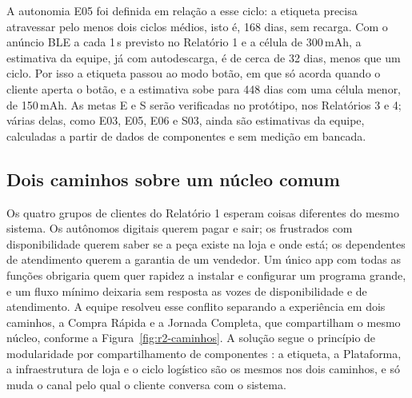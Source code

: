 A autonomia E05 foi definida em relação a esse ciclo: a etiqueta precisa atravessar pelo menos dois ciclos médios, isto é, 168 dias, sem recarga. Com o anúncio BLE a cada 1\,s previsto no Relatório 1 e a célula de 300\,mAh, a estimativa da equipe, já com autodescarga, é de cerca de 32 dias, menos que um ciclo. Por isso a etiqueta passou ao modo botão, em que só acorda quando o cliente aperta o botão, e a estimativa sobe para 448 dias com uma célula menor, de 150\,mAh. As metas E e S serão verificadas no protótipo, nos Relatórios 3 e 4; várias delas, como E03, E05, E06 e S03, ainda são estimativas da equipe, calculadas a partir de dados de componentes e sem medição em bancada.

\subsection{Dois caminhos sobre um núcleo comum}
\label{sub:r2-caminhos}

Os quatro grupos de clientes do Relatório 1 esperam coisas diferentes do mesmo sistema. Os autônomos digitais querem pagar e sair; os frustrados com disponibilidade querem saber se a peça existe na loja e onde está; os dependentes de atendimento querem a garantia de um vendedor. Um único app com todas as funções obrigaria quem quer rapidez a instalar e configurar um programa grande, e um fluxo mínimo deixaria sem resposta as vozes de disponibilidade e de atendimento. A equipe resolveu esse conflito separando a experiência em dois caminhos, a Compra Rápida e a Jornada Completa, que compartilham o mesmo núcleo, conforme a Figura~\ref{fig:r2-caminhos}. A solução segue o princípio de modularidade por compartilhamento de componentes \cite{rozenfeld2006gestao}: a etiqueta, a Plataforma, a infraestrutura de loja e o ciclo logístico são os mesmos nos dois caminhos, e só muda o canal pelo qual o cliente conversa com o sistema.


